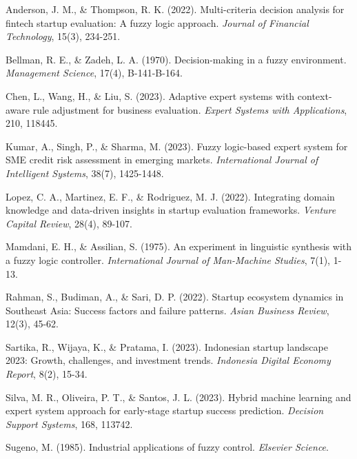 \documentclass{article}
\begin{document}

\begin{thebibliography}{99}

Anderson, J. M., \& Thompson, R. K. (2022). Multi-criteria decision analysis for fintech startup evaluation: A fuzzy logic approach. \textit{Journal of Financial Technology}, 15(3), 234-251.

Bellman, R. E., \& Zadeh, L. A. (1970). Decision-making in a fuzzy environment. \textit{Management Science}, 17(4), B-141-B-164.

Chen, L., Wang, H., \& Liu, S. (2023). Adaptive expert systems with context-aware rule adjustment for business evaluation. \textit{Expert Systems with Applications}, 210, 118445.

Kumar, A., Singh, P., \& Sharma, M. (2023). Fuzzy logic-based expert system for SME credit risk assessment in emerging markets. \textit{International Journal of Intelligent Systems}, 38(7), 1425-1448.

Lopez, C. A., Martinez, E. F., \& Rodriguez, M. J. (2022). Integrating domain knowledge and data-driven insights in startup evaluation frameworks. \textit{Venture Capital Review}, 28(4), 89-107.

Mamdani, E. H., \& Assilian, S. (1975). An experiment in linguistic synthesis with a fuzzy logic controller. \textit{International Journal of Man-Machine Studies}, 7(1), 1-13.

Rahman, S., Budiman, A., \& Sari, D. P. (2022). Startup ecosystem dynamics in Southeast Asia: Success factors and failure patterns. \textit{Asian Business Review}, 12(3), 45-62.

Sartika, R., Wijaya, K., \& Pratama, I. (2023). Indonesian startup landscape 2023: Growth, challenges, and investment trends. \textit{Indonesia Digital Economy Report}, 8(2), 15-34.

Silva, M. R., Oliveira, P. T., \& Santos, J. L. (2023). Hybrid machine learning and expert system approach for early-stage startup success prediction. \textit{Decision Support Systems}, 168, 113742.

Sugeno, M. (1985). Industrial applications of fuzzy control. \textit{Elsevier Science}.


\end{thebibliography}
\end{document}

